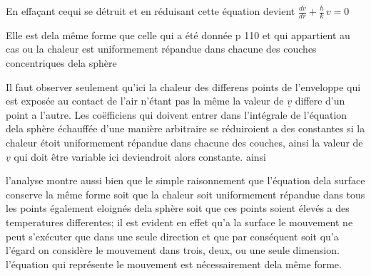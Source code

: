 \documentclass[11pt,a4paper]{article}
\begin{document}
En effaçant cequi se détruit et en réduisant cette équation
devient \quad $\frac{dv}{dr} + \frac{h}{k}\,v = 0$

Elle est dela même forme que celle qui a été donnée p
110 et qui appartient au cas ou la chaleur est uniformement
répandue dans chacune des couches concentriques dela sphère

Il faut observer seulement qu'ici la chaleur des differens
points de l'enveloppe qui est exposée au contact de l'air
n'étant pas la même la valeur de $\underline{v}$ differe d'un point
a l'autre. Les coëfficiens qui doivent entrer dans l'intégrale
de l'équation dela sphère échauffée d'une manière arbitraire
se réduiroient a des constantes si la chaleur étoit uniformement
répandue dans chacune des couches, ainsi la valeur de $\underline{v}$ qui
doit être variable ici deviendroit alors constante. ainsi



l'analyse montre aussi bien que le simple raisonnement que
l'équation dela surface conserve la même forme soit que
la chaleur soit uniformement répandue dans tous les
points également eloignés dela sphère soit que ces
 points  soient élevés a des
temperatures differentes; il est evident en effet qu'a
la surface le mouvement ne peut s'exécuter que dans
une seule direction et que par conséquent soit qu'a l'égard
   on considère le mouvement dans trois, deux,
ou une seule dimension. l'équation qui représente
le mouvement  est nécessairement dela même forme.
\end{document}
